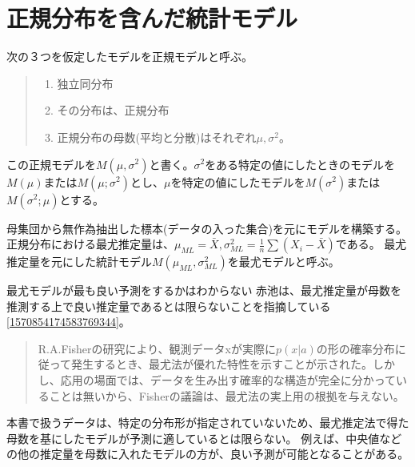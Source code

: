 \section{正規分布を含んだ統計モデル}
次の３つを仮定したモデルを正規モデルと呼ぶ。
\begin{quote}
    \begin{enumerate}[(1)]
    \item 独立同分布
    \item その分布は、正規分布
    \item 正規分布の母数(平均と分散)はそれぞれ$\mu,\sigma^2$。
    \end{enumerate}
\end{quote}
この正規モデルを$M(\mu,\sigma^2)$と書く。$\sigma^2$をある特定の値にしたときのモデルを$M(\mu)$または$M(\mu;\sigma^2)$とし、$\mu$を特定の値にしたモデルを$M(\sigma^2)$または$M(\sigma^2;\mu)$とする。

母集団から無作為抽出した標本(データの入った集合)を元にモデルを構築する。正規分布における最尤推定量は、$\mu_{ML}=\bar{X},\sigma^2_{ML}=\frac{1}{n}\sum(X_i-\bar{X})$である。
最尤推定量を元にした統計モデル$M(\mu_{ML},\sigma^2_{ML})$を最尤モデルと呼ぶ。

\begin{SMbox}{最尤モデルが最も良い予測をするかはわからない}
赤池は、最尤推定量が母数を推測する上で良い推定量であるとは限らないことを指摘している\ref{1570854174583769344}。
    \begin{quote}
    R.A.Fisherの研究により、観測データxが実際に$p(x|a)$の形の確率分布に従って発生するとき、最尤法が優れた特性を示すことが示された。しかし、応用の場面では、データを生み出す確率的な構造が完全に分かっていることは無いから、Fisherの議論は、最尤法の実上用の根拠を与えない。
    \end{quote}

    本書で扱うデータは、特定の分布形が指定されていないため、最尤推定法で得た母数を基にしたモデルが予測に適しているとは限らない。
    例えば、中央値などの他の推定量を母数に入れたモデルの方が、良い予測が可能となることがある。
\end{SMbox}

